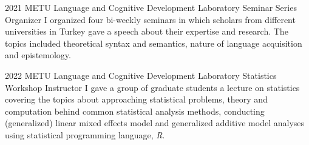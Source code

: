 


\begin{cvskills}
  \cvskill
    {2021} %
    {METU Language and Cognitive Development Laboratory Seminar Series} %
    {Organizer} %
    {I organized four bi-weekly seminars in which scholars from different universities in Turkey gave a speech about their expertise and research. The topics included theoretical syntax and semantics, nature of language acquisition and epistemology.}
    
\end{cvskills}

\begin{cvskills}

  \cvskill
    {2022} %
    {METU Language and Cognitive Development Laboratory Statistics Workshop} %
    {Instructor} %
    {I gave a group of graduate students a lecture on statistics covering the topics about approaching statistical problems, theory and computation behind common statistical analysis methods, conducting (generalized) linear mixed effects model and generalized additive model analyses using statistical programming language, \textit{R}.}
    
\end{cvskills}
\vspace{2cm}



